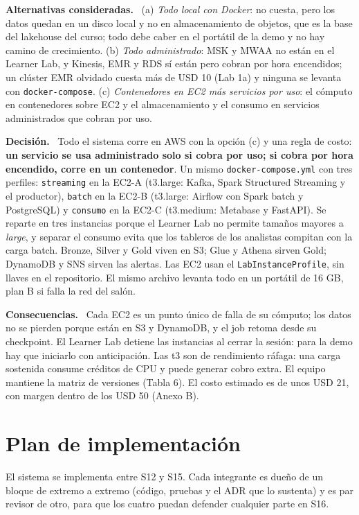 \documentclass[12pt,letterpaper]{article}
\newcommand{\code}[1]{{\small\texttt{#1}}}
\newcommand{\adrpart}[1]{\textbf{#1.}~}
\begin{document}
\adrpart{Alternativas consideradas} (a) \emph{Todo local con Docker}: no cuesta, pero los datos quedan en un disco local y no en almacenamiento de objetos, que es la base del lakehouse del curso; todo debe caber en el portátil de la demo y no hay camino de crecimiento. (b) \emph{Todo administrado}: MSK y MWAA no están en el Learner Lab, y Kinesis, EMR y RDS sí están pero cobran por hora encendidos; un clúster EMR olvidado cuesta más de USD 10 (Lab 1a) y ninguna se levanta con \code{docker-compose}. (c) \emph{Contenedores en EC2 más servicios por uso}: el cómputo en contenedores sobre EC2 y el almacenamiento y el consumo en servicios administrados que cobran por uso.

\adrpart{Decisión} Todo el sistema corre en AWS con la opción (c) y una regla de costo: \textbf{un servicio se usa administrado solo si cobra por uso; si cobra por hora encendido, corre en un contenedor}. Un mismo \code{docker-compose.yml} con tres perfiles: \code{streaming} en la EC2-A (t3.large: Kafka, Spark Structured Streaming y el productor), \code{batch} en la EC2-B (t3.large: Airflow con Spark batch y PostgreSQL) y \code{consumo} en la EC2-C (t3.medium: Metabase y FastAPI). Se reparte en tres instancias porque el Learner Lab no permite tamaños mayores a \emph{large}, y separar el consumo evita que los tableros de los analistas compitan con la carga batch. Bronze, Silver y Gold viven en S3; Glue y Athena sirven Gold; DynamoDB y SNS sirven las alertas. Las EC2 usan el \code{LabInstanceProfile}, sin llaves en el repositorio. El mismo archivo levanta todo en un portátil de 16 GB, plan B si falla la red del salón.

\adrpart{Consecuencias} Cada EC2 es un punto único de falla de su cómputo; los datos no se pierden porque están en S3 y DynamoDB, y el job retoma desde su checkpoint. El Learner Lab detiene las instancias al cerrar la sesión: para la demo hay que iniciarlo con anticipación. Las t3 son de rendimiento ráfaga: una carga sostenida consume créditos de CPU y puede generar cobro extra. El equipo mantiene la matriz de versiones (Tabla 6). El costo estimado es de unos USD 21, con margen dentro de los USD 50 (Anexo B).

\section{Plan de implementación}

El sistema se implementa entre S12 y S15. Cada integrante es dueño de un bloque de extremo a extremo (código, pruebas y el ADR que lo sustenta) y es par revisor de otro, para que los cuatro puedan defender cualquier parte en S16.
\end{document}
